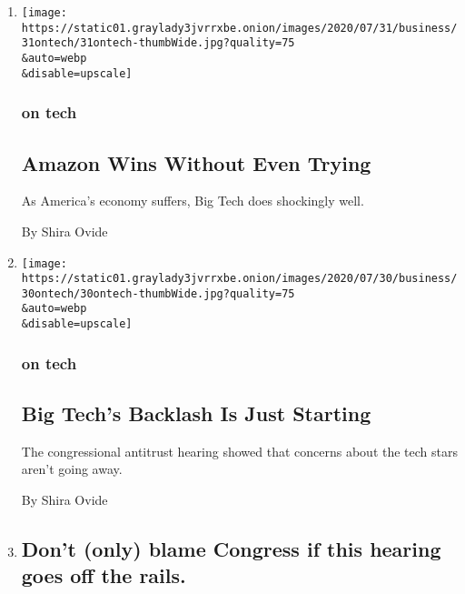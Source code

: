 \begin{enumerate}
\def\labelenumi{\arabic{enumi}.}
\item
  \href{/2020/07/31/technology/amazon-earnings.html}{}

  \texttt{[image: https://static01.graylady3jvrrxbe.onion/images/2020/07/31/business/31ontech/31ontech-thumbWide.jpg?quality=75\\\&auto=webp\\\&disable=upscale]}

  \hypertarget{on-tech}{%
  \subsubsection{on tech}\label{on-tech}}

  \hypertarget{amazon-wins-without-even-trying}{%
  \subsection{Amazon Wins Without Even
  Trying}\label{amazon-wins-without-even-trying}}

  As America's economy suffers, Big Tech does shockingly well.

  By Shira Ovide
\item
  \href{/2020/07/30/technology/big-tech-backlash.html}{}

  \texttt{[image: https://static01.graylady3jvrrxbe.onion/images/2020/07/30/business/30ontech/30ontech-thumbWide.jpg?quality=75\\\&auto=webp\\\&disable=upscale]}

  \hypertarget{on-tech-1}{%
  \subsubsection{on tech}\label{on-tech-1}}

  \hypertarget{big-techs-backlash-is-just-starting}{%
  \subsection{Big Tech's Backlash Is Just
  Starting}\label{big-techs-backlash-is-just-starting}}

  The congressional antitrust hearing showed that concerns about the
  tech stars aren't going away.

  By Shira Ovide
\item
  \href{/live/2020/07/29/technology/tech-ceos-hearing-testimony/dont-only-blame-congress-if-this-hearing-goes-off-the-rails}{}

  \hypertarget{dont-only-blame-congress-if-this-hearing-goes-off-the-rails}{%
  \subsection{Don't (only) blame Congress if this hearing goes off the
  rails.}\label{dont-only-blame-congress-if-this-hearing-goes-off-the-rails}}


\end{enumerate}
